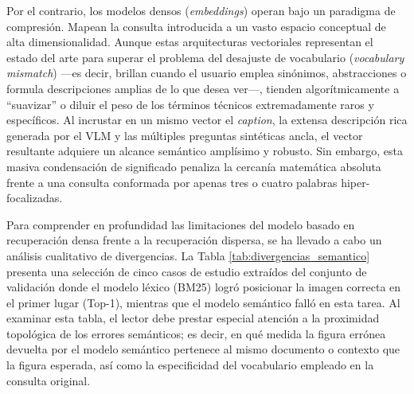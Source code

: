 \documentclass[a4paper]{report}
\begin{document}
Por el contrario, los modelos densos (\textit{embeddings}) operan bajo un paradigma de compresión. Mapean la consulta introducida a un vasto espacio conceptual de alta dimensionalidad. Aunque estas arquitecturas vectoriales representan el estado del arte para superar el problema del desajuste de vocabulario (\textit{vocabulary mismatch}) —es decir, brillan cuando el usuario emplea sinónimos, abstracciones o formula descripciones amplias de lo que desea ver—, tienden algorítmicamente a ``suavizar'' o diluir el peso de los términos técnicos extremadamente raros y específicos. Al incrustar en un mismo vector el \textit{caption}, la extensa descripción rica generada por el VLM y las múltiples preguntas sintéticas ancla, el vector resultante adquiere un alcance semántico amplísimo y robusto. Sin embargo, esta masiva condensación de significado penaliza la cercanía matemática absoluta frente a una consulta conformada por apenas tres o cuatro palabras hiper-focalizadas.

Para comprender en profundidad las limitaciones del modelo basado en recuperación densa frente a la recuperación dispersa, se ha llevado a cabo un análisis cualitativo de divergencias. La Tabla \ref{tab:divergencias_semantico} presenta una selección de cinco casos de estudio extraídos del conjunto de validación donde el modelo léxico (BM25) logró posicionar la imagen correcta en el primer lugar (Top-1), mientras que el modelo semántico falló en esta tarea. Al examinar esta tabla, el lector debe prestar especial atención a la proximidad topológica de los errores semánticos; es decir, en qué medida la figura errónea devuelta por el modelo semántico pertenece al mismo documento o contexto que la figura esperada, así como la especificidad del vocabulario empleado en la consulta original.
\end{document}
